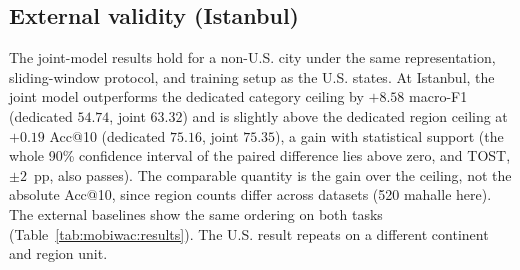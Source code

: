 \subsection{External validity (Istanbul)}
\label{sec:mobiwac:results-external}
The joint-model results hold for a non-U.S. city under the same representation, sliding-window protocol, and training setup as the U.S. states. At Istanbul, the
joint model outperforms the dedicated category ceiling by $+8.58$ macro-F1
(dedicated $54.74$, joint $63.32$) and is slightly above the dedicated region ceiling at $+0.19$
Acc@10 (dedicated $75.16$, joint $75.35$), a gain with statistical support (the whole 90\% confidence interval of the paired
difference lies above zero, and TOST, $\pm2$~pp, also passes). The comparable quantity is the gain over the ceiling, not the absolute
Acc@10, since region counts differ across datasets (520 mahalle here). The external baselines show the same ordering on both tasks
(Table~\ref{tab:mobiwac:results}).
The U.S. result repeats on a different continent and region unit.

